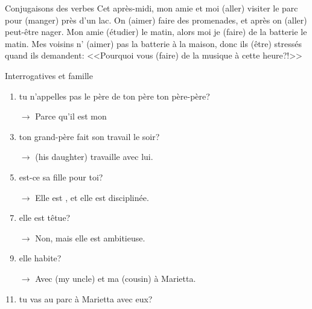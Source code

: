\documentclass{beamer}
\begin{document}
  \begin{frame}{Conjugaisons des verbes}
    Cet après-midi, mon amie et moi \underline{} (aller) visiter le parc pour \underline{} (manger) près d'un lac.
    On \underline{} (aimer) faire des promenades, et après on \underline{} (aller) peut-être nager.
    Mon amie \underline{} (étudier) le matin, alors moi je \underline{} (faire) de la batterie le matin.
    Mes voisins n'\underline{} (aimer) pas la batterie à la maison, donc ils \underline{} (être) stressés quand ils demandent: <<Pourquoi vous \underline{} (faire) de la musique à cette heure?!>>
  \end{frame}

  \begin{frame}{Interrogatives et famille}
    \begin{enumerate}
      \item \underline{} tu n'appelles pas le père de ton père ton père-père?
      \item[$\to$] Parce qu'il est mon \underline{}
      \item \underline{} ton grand-père fait son travail le soir?
      \item[$\to$] \underline{} (his daughter) travaille avec lui.
      \item \underline{} est-ce sa fille pour toi?
      \item[$\to$] Elle est \underline{}, et elle est disciplinée.
      \item \underline{}elle est têtue?
      \item[$\to$] Non, mais elle est ambitieuse.
      \item \underline{} elle habite?
      \item[$\to$] Avec \underline{} (my uncle) et ma \underline{} (cousin) à Marietta.
      \item \underline{} tu vas au parc à Marietta avec eux?
    \end{enumerate}
  \end{frame}
\end{document}
